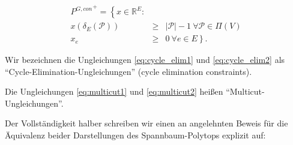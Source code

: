 \documentclass[10p,a4paper,BCOR = 12mm, DIV=15]{scrbook}
\begin{document}
\begin{Kor}
\begin{eqnarray}
{P^{G, con}}^+ =  \left\{ x \in \mathbb{R}^E: \right. & & \nonumber \\
x\left(\delta_E\left(\mathcal{P}\right)\right) & \geq & \left|\mathcal{P}\right|-1\ \forall \mathcal{P} \in \Pi\left(V\right) \\
x_e & \geq & \left. 0\ \forall e \in E \right\}. \nonumber
\end{eqnarray}
\end{Kor}

\begin{Bem}
Wir bezeichnen die Ungleichungen \eqref{eq:cycle_elim1} und \eqref{eq:cycle_elim2} als "`Cycle-Elimination-Ungleichungen"' (cycle elimination constraints).

Die Ungleichungen \eqref{eq:multicut1} und \eqref{eq:multicut2} heißen "`Multicut-Ungleichungen"'.
\end{Bem}

Der Vollständigkeit halber schreiben wir einen an \cite{magnanti_wolsey1995} angelehnten Beweis für die Äquivalenz beider Darstellungen des Spannbaum-Polytops explizit auf:
\end{document}
